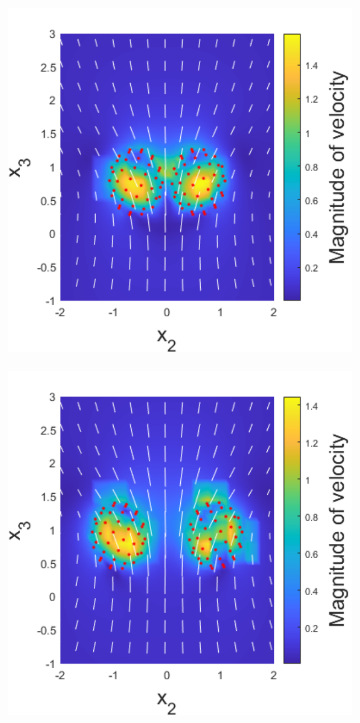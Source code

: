 \begin{figure}
\begin{subfigure}[b]{0.22\textwidth}
    \caption[]{\label{fig:PairF}}
\end{subfigure}
\begin{subfigure}[b]{0.22\textwidth}
    \centering
    \includegraphics[width=\textwidth]{Images/squirmers/Pair-7.pdf}
    \caption[]{\label{fig:PairG}}
\end{subfigure}
\begin{subfigure}[b]{0.22\textwidth}
    \centering
    \includegraphics[width=\textwidth]{Images/squirmers/Pair-8.pdf}

\end{subfigure}
\end{figure}
